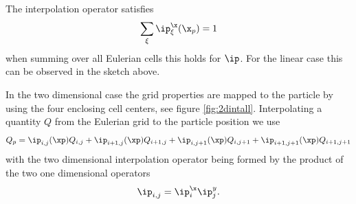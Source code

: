 The interpolation operator satisfies
\begin{equation*}
    \sum_{\xi} \ip_\xi^\x (\x_p) =1
\end{equation*}
when summing over all Eulerian cells this holds for $\ip$.
For the linear case this can be observed in the sketch above.

In the two dimensional case the grid properties are mapped to the particle by using the four enclosing cell centers, see figure \ref{fig:2dintall}. 
Interpolating a quantity $Q$ from the Eulerian grid to the particle position we use
\begin{equation*}
    Q_p = \ip_{i,j} (\xp) Q_{i,j} + \ip_{i+1,j} (\xp) Q_{i+1,j}+ \ip_{i,j+1} (\xp) Q_{i,j+1}+ \ip_{i+1,j+1} (\xp) Q_{i+1,j+1}
\end{equation*}
with the two dimensional interpolation operator being formed by the product of the two one dimensional operators
\begin{equation*}
    \ip_{i,j} = \ip_i^\x \ip_j^y.
\end{equation*}


